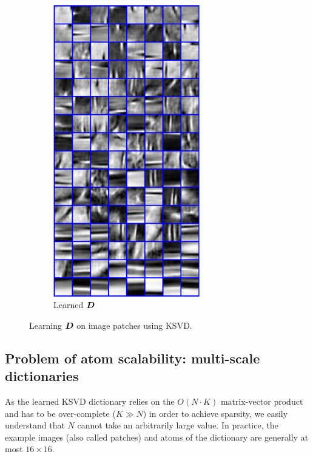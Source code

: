 \begin{figure}[!ht]
\begin{subfigure}[b]{0.29\textwidth}
	\includegraphics[width=0.7\textwidth]{figures/ksvd/dictionary.pdf}
	\caption{Learned $\bm{D}$}\label{fig_ksvd_dict}
\end{subfigure}
\caption{Learning $\bm{D}$ on image patches using \ac{KSVD}.}\label{fig_ksvd}
\end{figure}


\subsection{Problem of atom scalability: multi-scale dictionaries}
As the learned \ac{KSVD} dictionary relies on the $O(N \cdot K)$ matrix-vector product and has to be over-complete ($K \gg N$) in order to achieve sparsity, we easily understand that $N$ cannot take an arbitrarily large value. In practice, the example images (also called patches) and atoms of the dictionary are generally at most $16 \times 16$.

